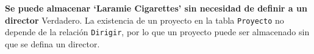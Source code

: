 \textbf{Se puede almacenar ‘Laramie Cigarettes’ sin necesidad de definir a un director}\vspace{.3cm}
Verdadero. La existencia de un proyecto en la tabla \texttt{Proyecto} no depende de la relación \texttt{Dirigir}, por lo que un proyecto puede ser almacenado sin que se defina un director.
